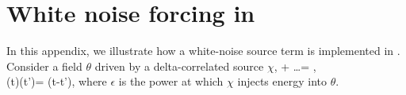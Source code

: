 
\chapter{White noise forcing in \Gand}
\label{gandalf:app:forcing}

In this appendix, we illustrate how a white-noise source term is implemented in \Gand.
Consider a field $\theta$ driven by a delta-correlated source $\chi$,
\bea
     + \ldots = \chi,\\
    \langle\chi(t)\chi(t')\rangle = \epsilon \delta(t-t'),
\eea
where $\epsilon$ is the power at which $\chi$ injects energy into $\theta$.

